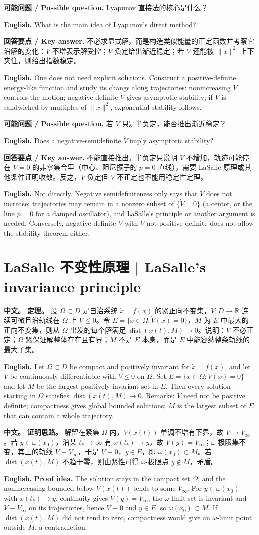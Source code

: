 \documentclass[UTF8,11pt,a4paper]{ctexart}
\newcommand{\EN}[1]{\par\noindent\textbf{English.} #1\par}
\newcommand{\ASK}[4]{\begin{samepage}\par\noindent\textbf{可能问题 / Possible question.} #1\par\EN{#2}\noindent\textbf{回答要点 / Key answer.} #3\par\EN{#4}\smallskip\end{samepage}}
\newcommand{\APS}[2]{\par\noindent\textbf{中文。} #1\par\noindent\textbf{English.} #2\par}
\newcommand{\R}{\mathbb{R}}\newcommand{\N}{\mathbb{N}}
\newcommand{\norm}[1]{\lVert #1\rVert}\newcommand{\abs}[1]{\lvert #1\rvert}
\begin{document}
\ASK{Lyapunov 直接法的核心是什么？}{What is the main idea of Lyapunov's direct method?}{不必求显式解，而是构造类似能量的正定函数并考察它沿解的变化：$V$ 不增表示解受控；$\dot V$ 负定给出渐近稳定；若 $V$ 还能被 $\norm{x}^2$ 上下夹住，则给出指数稳定。}{One does not need explicit solutions. Construct a positive-definite energy-like function and study its change along trajectories: nonincreasing $V$ controls the motion; negative-definite $\dot V$ gives asymptotic stability; if $V$ is sandwiched by multiples of $\norm{x}^2$, exponential stability follows.}

\ASK{若 $\dot V$ 只是半负定，能否推出渐近稳定？}{Does a negative-semidefinite $\dot V$ imply asymptotic stability?}{不能直接推出。半负定只说明 $V$ 不增加，轨迹可能停在 $\dot V=0$ 的非零集合里（中心、阻尼振子的 $p=0$ 直线），需要 LaSalle 原理或其他条件证明收敛。反之，$\dot V$ 负定但 $V$ 不正定也不能用稳定性定理。}{Not directly. Negative semidefiniteness only says that $V$ does not increase; trajectories may remain in a nonzero subset of $\{\dot V=0\}$ (a center, or the line $p=0$ for a damped oscillator), and LaSalle's principle or another argument is needed. Conversely, negative-definite $\dot V$ with $V$ not positive definite does not allow the stability theorem either.}

\section{LaSalle 不变性原理 | LaSalle's invariance principle}
\APS{\textbf{定理。} 设 $\Omega\subset D$ 是自治系统 $\dot x=f(x)$ 的紧正向不变集，$V:D\to\R$ 连续可微且沿轨线在 $\Omega$ 上 $\dot V\le0$。令 $E=\{x\in\Omega:\dot V(x)=0\}$，$M$ 为 $E$ 中最大的正向不变集，则从 $\Omega$ 出发的每个解满足 $\operatorname{dist}(x(t),M)\to0$。说明：$V$ 不必正定；$\Omega$ 紧保证解整体存在且有界；$M$ 不是 $E$ 本身，而是 $E$ 中能容纳整条轨线的最大子集。}{Let $\Omega\subset D$ be compact and positively invariant for $\dot x=f(x)$, and let $V$ be continuously differentiable with $\dot V\le0$ on $\Omega$. Set $E=\{x\in\Omega:\dot V(x)=0\}$ and let $M$ be the largest positively invariant set in $E$. Then every solution starting in $\Omega$ satisfies $\operatorname{dist}(x(t),M)\to0$. Remarks: $V$ need not be positive definite; compactness gives global bounded solutions; $M$ is the largest subset of $E$ that can contain a whole trajectory.}

\APS{\textbf{证明思路。} 解留在紧集 $\Omega$ 内，$V(x(t))$ 单调不增有下界，故 $V\to V_\infty$。若 $y\in\omega(x_0)$，沿某 $t_k\to\infty$ 有 $x(t_k)\to y$，故 $V(y)=V_\infty$；$\omega$-极限集不变，其上的轨线 $V\equiv V_\infty$，于是 $\dot V\equiv0$，$y\in E$，即 $\omega(x_0)\subset M$。若 $\operatorname{dist}(x(t),M)$ 不趋于零，则由紧性可得 $\omega$-极限点 $y\notin M$，矛盾。}{\textbf{Proof idea.} The solution stays in the compact set $\Omega$, and the nonincreasing bounded-below $V(x(t))$ tends to some $V_\infty$. For $y\in\omega(x_0)$ with $x(t_k)\to y$, continuity gives $V(y)=V_\infty$; the $\omega$-limit set is invariant and $V\equiv V_\infty$ on its trajectories, hence $\dot V\equiv0$ and $y\in E$, so $\omega(x_0)\subset M$. If $\operatorname{dist}(x(t),M)$ did not tend to zero, compactness would give an $\omega$-limit point outside $M$, a contradiction.}
\end{document}
